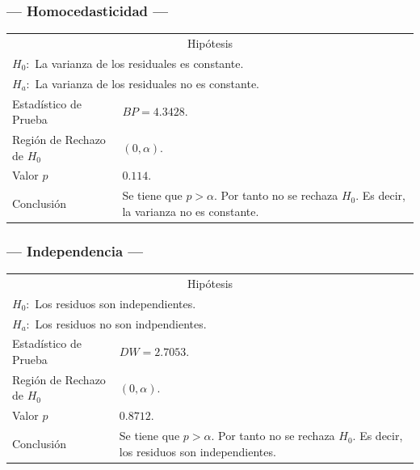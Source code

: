 \subsubsection{--- Homocedasticidad ---} %
\begin{center}
  \begin{tabular}{|l|p{8cm}|}
    \cline{1-2}
    \multicolumn{2}{|c|}{Hipótesis}\\ \cline{1-2}
    \multicolumn{2}{|l|}{\(H_0:\) La varianza de los residuales es constante.} \\ 
    \multicolumn{2}{|l|}{\(H_a:\) La varianza de los residuales no es constante.} \\ \cline{1-2}
    Estadístico de Prueba & \(BP = 4.3428\).\\ \cline{1-2} 
		Región de Rechazo de \(H_0\) & \((0, \alpha )\).\\ \cline{1-2} 
    Valor \(p\) & \(0.114\).\\ \cline{1-2} 
    Conclusión & Se tiene que \(p> \alpha\). \newline 
		Por tanto no se rechaza \(H_0\). \newline 
		Es decir, la varianza no es constante. \\ \cline{1-2} 
  \end{tabular}
\end{center}

\subsubsection{--- Independencia ---} %
\begin{center}
  \begin{tabular}{|l|p{8cm}|}
    \cline{1-2}
    \multicolumn{2}{|c|}{Hipótesis}\\ \cline{1-2}
    \multicolumn{2}{|l|}{\(H_0:\) Los residuos son independientes.} \\ 
    \multicolumn{2}{|l|}{\(H_a:\) Los residuos no son indpendientes.} \\ \cline{1-2}
    Estadístico de Prueba & \(DW = 2.7053\).\\ \cline{1-2} 
		Región de Rechazo de \(H_0\) & \((0, \alpha )\).\\ \cline{1-2} 
    Valor \(p\) & \(0.8712\).\\ \cline{1-2} 
    Conclusión & Se tiene que \(p> \alpha\). \newline 
		Por tanto no se rechaza \(H_0\). \newline 
		Es decir, los residuos son independientes.\\ \cline{1-2} 
  \end{tabular}
\end{center}


